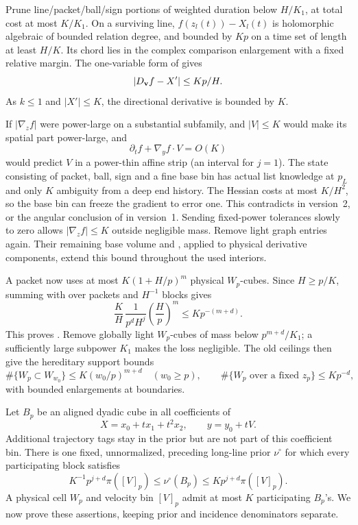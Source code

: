 Prune line/packet/ball/sign portions of weighted duration below
\(H/K_1\), at total cost at most \(K/K_1\).
On a surviving line, \(f(z_l(t))-X_l(t)\) is holomorphic algebraic
of bounded relation degree, and bounded by \(Kp\) on a time set
of length at least \(H/K\). Its chord lies in the complex
comparison enlargement with a fixed relative margin.
The one-variable form of  gives
\begin{equation}\label{a05:graph-directional}
 |D_{\bf v}f-X'|\leq Kp/H.
\end{equation}
As \(k\leq1\) and \(|X'|\leq K\), the directional derivative is
bounded by \(K\).

If \(|\nabla_zf|\) were power-large on a substantial subfamily,
 and \(|V|\leq K\) would make its
spatial part power-large, and
\[
 \partial_tf+\nabla_yf\cdot V=O(K)
\]
would predict \(V\) in a power-thin affine strip (an interval for
\(j=1\)). The state consisting of packet, ball, sign and a fine
base bin has actual list knowledge at \(p_L\) and only \(K\)
ambiguity from a deep end history. The Hessian costs at most
\(K/H^2\), so the base bin can freeze the gradient to error one.
This contradicts  in version~2, or the
angular conclusion of  in version~1.
Sending fixed-power tolerances slowly to zero allows
\(|\nabla_zf|\leq K\) outside negligible mass. Remove light graph
entries again. Their remaining base volume and
, applied to physical derivative
components, extend this bound throughout the used interiors.

A packet now uses at most \(K(1+H/p)^m\) physical \(W_p\)-cubes.
Since \(H\geq p/K\), summing with  over
packets and \(H^{-1}\) blocks gives
\[
 \frac{K}{H}\,\frac{1}{p^dH^j}
       \left(\frac Hp\right)^m
 \leq Kp^{-(m+d)}.
\]
This proves . Remove globally light
\(W_p\)-cubes of mass below \(p^{m+d}/K_1\); a sufficiently large
subpower \(K_1\) makes the loss negligible. The old ceilings then
give the hereditary support bounds
\begin{equation}\label{a05:local-support}
 \#\{W_p\subset W_{w_0}\}\leq K(w_0/p)^{m+d}\quad(w_0\geq p),
 \qquad
 \#\{W_p\text{ over a fixed }z_p\}\leq Kp^{-d},
\end{equation}
with bounded enlargements at boundaries.

Let \(B_p\) be an aligned dyadic cube in all coefficients of
\[
 X=x_0+tx_1+t^2x_2,\qquad y=y_0+tV.
\]
Additional trajectory tags stay in the prior but are not part of
this coefficient bin. There is one fixed, unnormalized,
preceding long-line prior \(\nu^\circ\) for which every
participating block satisfies
\begin{equation}\label{a05:parameter-floor}
 K^{-1}p^{j+d}\pi([V]_p)
 \leq \nu^\circ(B_p)
 \leq Kp^{j+d}\pi([V]_p).
\end{equation}
A physical cell \(W_p\) and velocity bin \([V]_p\) admit at most
\(K\) participating \(B_p\)'s. We now prove these assertions,
keeping prior and incidence denominators separate.

